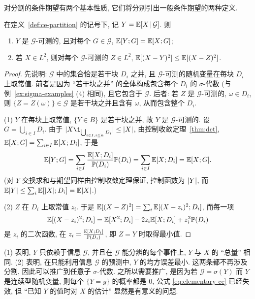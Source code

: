 对分割的条件期望有两个基本性质, 它们将分别引出一般条件期望的两种定义.

\begin{proposition}\label{prop:ce-partition-properties}
在定义~\ref{def:ce-partition} 的记号下, 记 $Y=\mathbb{E}[X\,|\,\mathcal{G}]$. 则
\begin{enumerate}
\item $Y$ 是 $\mathcal{G}$-可测的, 且对每个 $G\in\mathcal{G}$, $\mathbb{E}[Y;G]=\mathbb{E}[X;G]$;
\item 若 $X\in L^2$, 则对每个 $\mathcal{G}$-可测的 $Z\in L^2$, $\mathbb{E}[(X-Y)^2]\le\mathbb{E}[(X-Z)^2]$.
\end{enumerate}
\end{proposition}

\begin{proof}
先说明: $\mathcal{G}$ 中的集合恰是若干块 $D_i$ 之并, 且 $\mathcal{G}$-可测的随机变量在每块 $D_i$ 上取常值. 前者是因为 ``若干块之并'' 的全体构成包含每个 $D_i$ 的 $\sigma$-代数 (与例~\ref{ex:sigma-examples} (4) 相同), 且它包含于 $\mathcal{G}$. 后者: 若 $Z$ 是 $\mathcal{G}$-可测的, $\omega\in D_i$, 则 $\{Z=Z(\omega)\}\in\mathcal{G}$ 是若干块之并且含有 $\omega$, 从而包含整个 $D_i$.

(1) $Y$ 在每块上取常值, $\{Y\in B\}$ 是若干块之并, 故 $Y$ 是 $\mathcal{G}$-可测的. 设 $G=\bigcup_{i\in I}D_i$. 由于 $\abs{X\1_{\bigcup_{i\in I,i\le n}D_i}}\le\abs{X}$, 由控制收敛定理~\ref{thm:dct}, $\mathbb{E}[X;G]=\sum_{i\in I}\mathbb{E}[X;D_i]$, 于是
\[
\mathbb{E}[Y;G]=\sum_{i\in I}\frac{\mathbb{E}[X;D_i]}{\mathbb{P}(D_i)}\mathbb{P}(D_i)=\sum_{i\in I}\mathbb{E}[X;D_i]=\mathbb{E}[X;G].
\]
(对 $Y$ 交换求和与期望同样由控制收敛定理保证, 控制函数为 $\lvert Y\rvert$, 而 $\mathbb{E}\lvert Y\rvert\le\sum_i\mathbb{E}[\lvert X\rvert;D_i]=\mathbb{E}\lvert X\rvert$.)

(2) $Z$ 在 $D_i$ 上取常值 $z_i$. 于是 $\mathbb{E}[(X-Z)^2]=\sum_i\mathbb{E}[(X-z_i)^2;D_i]$, 而每一项
\[
\mathbb{E}[(X-z_i)^2;D_i]=\mathbb{E}[X^2;D_i]-2z_i\mathbb{E}[X;D_i]+z_i^2\mathbb{P}(D_i)
\]
是 $z_i$ 的二次函数, 在 $z_i=\frac{\mathbb{E}[X;D_i]}{\mathbb{P}(D_i)}$, 即 $Z=Y$ 时取得最小值.
\end{proof}

\begin{intuition}
(1) 表明, $Y$ 只依赖于信息 $\mathcal{G}$, 并且在 $\mathcal{G}$ 能分辨的每个事件上, $Y$ 与 $X$ 的 ``总量'' 相同. (2) 表明, 在只能利用信息 $\mathcal{G}$ 的预测中, $Y$ 的均方误差最小. 这两条都不再涉及分割, 因此可以推广到任意子 $\sigma$-代数. 之所以需要推广, 是因为若 $\mathcal{G}=\sigma(Y)$ 而 $Y$ 是连续型随机变量, 则每个 $\{Y=y\}$ 的概率都是 $0$, 公式 \eqref{eq:elementary-ce} 已经失效, 但 ``已知 $Y$ 的值时对 $X$ 的估计'' 显然是有意义的问题.
\end{intuition}


